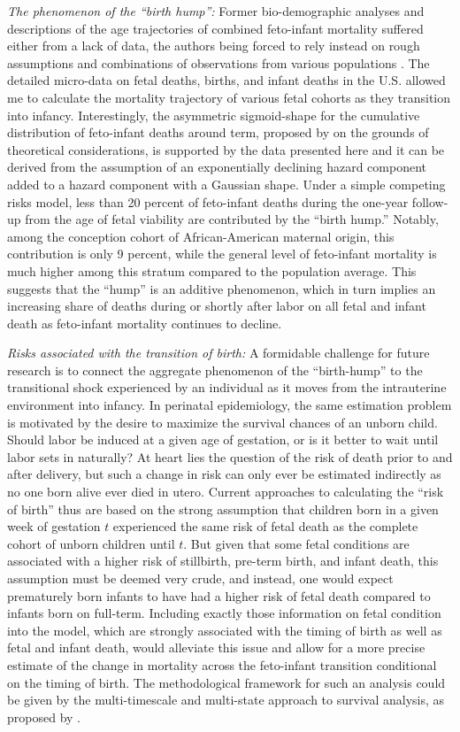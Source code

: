 \documentclass[10pt, twoside]{article}
\begin{document}
\emph{The phenomenon of the ``birth hump'':} Former bio-demographic analyses and descriptions of the age trajectories of combined feto-infant mortality suffered either from a lack of data, the authors being forced to rely instead on rough assumptions and combinations of observations from various populations \citep{Williamson2003, Woods2009, Levitis2011, Berrut2016}. The detailed micro-data on fetal deaths, births, and infant deaths in the U.S. allowed me to calculate the mortality trajectory of various fetal cohorts as they transition into infancy. Interestingly, the asymmetric sigmoid-shape for the cumulative distribution of feto-infant deaths around term, proposed by \citet{Williamson2003} on the grounds of theoretical considerations, is supported by the data presented here and it can be derived from the assumption of an exponentially declining hazard component added to a hazard component with a Gaussian shape. Under a simple competing risks model, less than 20 percent of feto-infant deaths during the one-year follow-up from the age of fetal viability are contributed by the ``birth hump.'' Notably, among the conception cohort of African-American maternal origin, this contribution is only 9 percent, while the general level of feto-infant mortality is much higher among this stratum compared to the population average. This suggests that the ``hump'' is an additive phenomenon, which in turn implies an increasing share of deaths during or shortly after labor on all fetal and infant death as feto-infant mortality continues to decline.

\emph{Risks associated with the transition of birth:} A formidable challenge for future research is to connect the aggregate phenomenon of the ``birth-hump'' to the transitional shock experienced by an individual as it moves from the intrauterine environment into infancy. In perinatal epidemiology, the same estimation problem is motivated by the desire to maximize the survival chances of an unborn child. Should labor be induced at a given age of gestation, or is it better to wait until labor sets in naturally? At heart lies the question of the risk of death prior to and after delivery, but such a change in risk can only ever be estimated indirectly as no one born alive ever died in utero. Current approaches to calculating the ``risk of birth'' thus are based on the strong assumption that children born in a given week of gestation \(t\) experienced the same risk of fetal death as the complete cohort of unborn children until \(t\). But given that some fetal conditions are associated with a higher risk of stillbirth, pre-term birth, and infant death, this assumption must be deemed very crude, and instead, one would expect prematurely born infants to have had a higher risk of fetal death compared to infants born on full-term. Including exactly those information on fetal condition into the model, which are strongly associated with the timing of birth as well as fetal and infant death, would alleviate this issue and allow for a more precise estimate of the change in mortality across the feto-infant transition conditional on the timing of birth. The methodological framework for such an analysis could be given by the multi-timescale and multi-state approach to survival analysis, as proposed by \citet{Iacobelli2013}.
\end{document}
